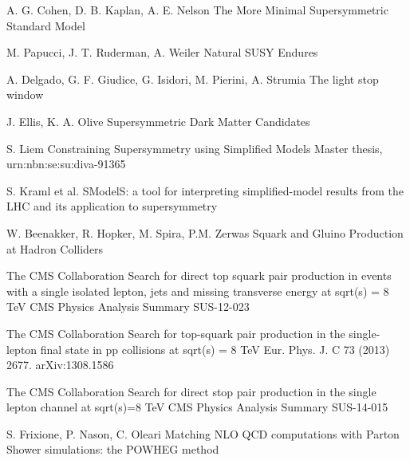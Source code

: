 \begin{thebibliography}{2}
{
             {A. G. Cohen, D. B. Kaplan, A. E. Nelson}
             {The More Minimal Supersymmetric Standard Model}
             {}}

             {M. Papucci, J. T. Ruderman, A. Weiler}
             {Natural SUSY Endures}
             {}

             {A. Delgado, G. F. Giudice, G. Isidori, M. Pierini, A. Strumia}
             {The light stop window}
             {}

             {J. Ellis, K. A. Olive}
             {Supersymmetric Dark Matter Candidates}
             {}

             {S. Liem}
             {Constraining Supersymmetry using Simplified Models}
             {Master thesis, urn:nbn:se:su:diva-91365}

             {S. Kraml et al.}
             {SModelS: a tool for interpreting simplified-model results from the LHC and its application to supersymmetry}
             {}

             {W. Beenakker, R. Hopker, M. Spira, P.M. Zerwas}
             {Squark and Gluino Production at Hadron Colliders}
             {}


             {The CMS Collaboration}
             {Search for direct top squark pair production in events with a single isolated lepton, jets and missing transverse energy at sqrt(s) = 8 TeV}
             {CMS Physics Analysis Summary SUS-12-023}

             {The CMS Collaboration}
             {Search for top-squark pair production in the single-lepton final state in pp collisions at sqrt(s) = 8 TeV}
             {Eur. Phys. J. C 73 (2013) 2677. arXiv:1308.1586}

             {The CMS Collaboration}
             {Search for direct stop pair production in the single lepton channel at sqrt(s)=8 TeV}
             {CMS Physics Analysis Summary SUS-14-015}


             {S. Frixione, P. Nason, C. Oleari}
             {Matching NLO QCD computations with Parton Shower simulations: the POWHEG method}
             {}


\end{thebibliography}
